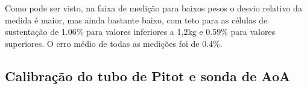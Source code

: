 Como pode ser visto, na faixa de medição para baixos pesos o desvio relativo da medida é maior, mas ainda bastante baixo, com teto para as células de sustentação de 1.06\% para valores inferiores a 1,2kg e 0.59\% para valores superiores. O erro médio de todas as medições foi de 0.4\%.








\subsection{Calibração do tubo de Pitot e sonda de AoA}

